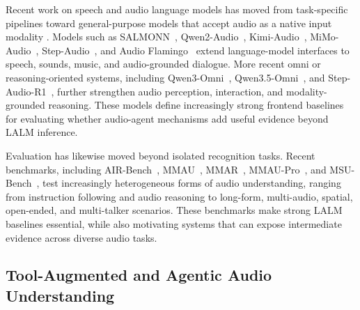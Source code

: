 \documentclass[11pt]{article}
\begin{document}
Recent work on speech and audio language models has moved from task-specific pipelines toward general-purpose models that accept audio as a native input modality \citep{peng2024survey_speech_llms_understanding,cui2024recent_speechlm_survey}. Models such as SALMONN~\citep{tang2023salmonn}, Qwen2-Audio~\citep{chu2024qwen2audio}, Kimi-Audio~\citep{ding2025kimi}, MiMo-Audio~\citep{zhang2025mimo}, Step-Audio~\citep{huang2025step}, and Audio Flamingo~\citep{kong2024audioflamingo,goel2025audioflamingo3} extend language-model interfaces to speech, sounds, music, and audio-grounded dialogue. More recent omni or reasoning-oriented systems, including Qwen3-Omni~\citep{xu2025qwen3}, Qwen3.5-Omni~\citep{qwen2026qwen35omni}, and Step-Audio-R1~\citep{stepfun2025stepaudior1}, further strengthen audio perception, interaction, and modality-grounded reasoning. These models define increasingly strong frontend baselines for evaluating whether audio-agent mechanisms add useful evidence beyond LALM inference.

Evaluation has likewise moved beyond isolated recognition tasks. Recent benchmarks, including AIR-Bench~\citep{yang2024airbench}, MMAU~\citep{sakshi2024mmau}, MMAR~\citep{ma2025mmar}, MMAU-Pro~\citep{kumar2025mmaupro}, and MSU-Bench~\citep{wang2025msubench}, test increasingly heterogeneous forms of audio understanding, ranging from instruction following and audio reasoning to long-form, multi-audio, spatial, open-ended, and multi-talker scenarios. These benchmarks make strong LALM baselines essential, while also motivating systems that can expose intermediate evidence across diverse audio tasks.

\subsection{Tool-Augmented and Agentic Audio Understanding}
\end{document}
